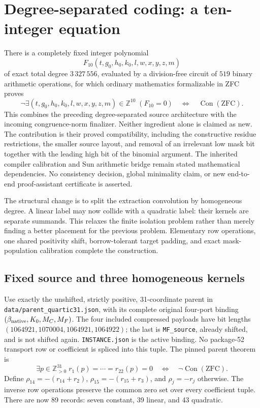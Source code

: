 \section{Degree-separated coding: a ten-integer equation}
\label{sec:wave9-signed}

There is a completely fixed integer polynomial
\[
 F_{10}(t,g_0,h_0,k_0,l,w,x,y,z,m)
\]
of exact total degree $3\,327\,556$, evaluated by a division-free circuit of
$519$ binary arithmetic operations, for which ordinary mathematics
formalizable in ZFC proves
\[
 \neg\exists(t,g_0,h_0,k_0,l,w,x,y,z,m)\in\mathbb Z^{10}\;(F_{10}=0)
 \quad\Longleftrightarrow\quad\operatorname{Con}(\mathrm{ZFC}).
\]
This combines the preceding degree-separated source architecture with the incoming congruence-norm finalizer. Neither ingredient alone is claimed as new. The contribution is their proved compatibility, including the constructive residue restrictions, the smaller source layout, and removal of an irrelevant low mask bit together with the leading high bit of the binomial argument.
The inherited compiler calibration and Sun arithmetic bridge remain stated
mathematical dependencies. No consistency decision, global minimality claim,
or new end-to-end proof-assistant certificate is asserted.

The structural change is to split the extraction convolution by homogeneous
degree. A linear label may now collide with a quadratic label: their kernels
are separate summands. This relaxes the finite isolation problem rather than
merely finding a better placement for the previous problem. Elementary row
operations, one shared positivity shift, borrow-tolerant target padding,
and exact mask-population calibration complete the construction.

\subsection{Fixed source and three homogeneous kernels}

Use exactly the unshifted, strictly positive, 31-coordinate parent in
\texttt{data/parent\_quartic31.json}, with its complete original four-port
binding $(\beta_{\rm native},K_0,M_C,M_F)$. The four included compressed
payloads have bit lengths $(1064921,1070004,1064921,1064922)$; the last is
\texttt{MF\_source}, already shifted, and is not shifted again.
\texttt{INSTANCE.json} is the active binding. No package-52 transport row or
coefficient is spliced into this tuple. The pinned parent theorem is
\[
 \exists p\in\mathbb Z_{>0}^{31}\;r_1(p)=\cdots=r_{22}(p)=0
 \quad\Longleftrightarrow\quad\neg\operatorname{Con}(\mathrm{ZFC}).
\]
Define $\rho_{14}=-(r_{14}+r_2)$, $\rho_{15}=-(r_{15}+r_3)$, and $\rho_j=-r_j$ otherwise. The inverse row
operations preserve the common zero set over every coefficient tuple.
There are now 89 records: seven constant, 39 linear, and 43 quadratic.

